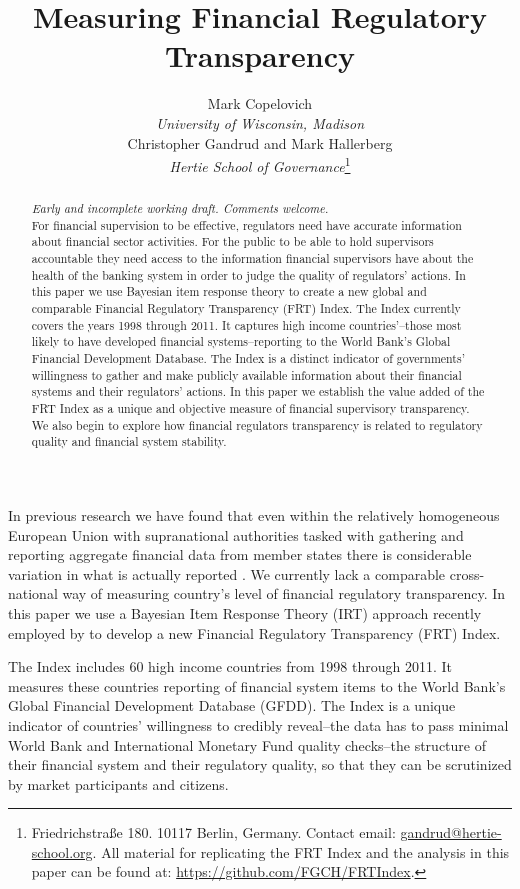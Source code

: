 \documentclass[a4paper]{article}
\title{Measuring Financial Regulatory Transparency}
\author{Mark Copelovich \\ \emph{University of Wisconsin, Madison} \\[0.5cm] Christopher Gandrud and Mark Hallerberg \\ 
    {\emph{Hertie School of Governance}}\footnote{Friedrichstra{\ss}e 180. 10117 Berlin, Germany. Contact email: \href{mailto:gandrud@hertie-school.org}{gandrud@hertie-school.org}. All material for replicating the FRT Index and the analysis in this paper can be found at: \url{https://github.com/FGCH/FRTIndex}.}}
\begin{document}
\maketitle

\begin{abstract}
\noindent \emph{Early and incomplete working draft. Comments welcome.} \\
    For financial supervision to be effective, regulators need have accurate information about financial sector activities. For the public to be able to hold supervisors accountable they need access to the information financial supervisors have about the health of the banking system in order to judge the quality of regulators' actions. In this paper we use Bayesian item response theory to create a new global and comparable Financial Regulatory Transparency (FRT) Index. The Index currently covers the years 1998 through 2011. It captures high income countries'--those most likely to have developed financial systems--reporting to the World Bank's Global Financial Development Database. The Index is a distinct indicator of governments' willingness to gather and make publicly available information about their financial systems and their regulators' actions. In this paper we establish the value added of the FRT Index as a unique and objective measure of financial supervisory transparency. We also begin to explore how financial regulators transparency is related to regulatory quality and financial system stability.  
\end{abstract}

In previous research we have found that even within the relatively homogeneous European Union with supranational authorities tasked with gathering and reporting aggregate financial data from member states there is considerable variation in what is actually reported \cite[see][]{Gandrud2014a}. We currently lack a comparable cross-national way of measuring country's level of financial regulatory transparency. In this paper we use a Bayesian Item Response Theory (IRT) approach recently employed by \cite{Hollyer2014} to develop a new Financial Regulatory Transparency (FRT) Index. 

The Index includes 60 high income countries from 1998 through 2011. It measures these countries reporting of financial system items to the World Bank's Global Financial Development Database (GFDD). The Index is a unique indicator of countries' willingness to credibly reveal--the data has to pass minimal World Bank and International Monetary Fund quality checks--the structure of their financial system and their regulatory quality, so that they can be scrutinized by market participants and citizens.
\end{document}
